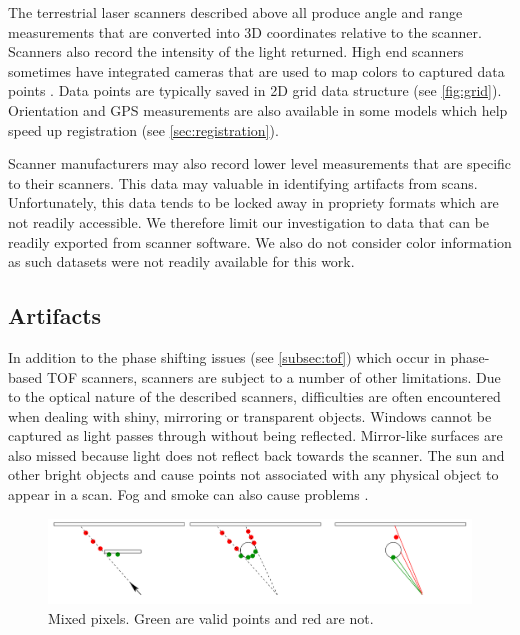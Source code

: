 The terrestrial laser scanners described above all produce angle and range measurements that are converted into 3D coordinates relative to the scanner. Scanners also record the intensity of the light returned. High end scanners sometimes have integrated cameras that are used to map colors to captured data points \cite{Frohlich2004}. Data points are typically saved in 2D grid data structure (see \autoref{fig:grid}). Orientation and GPS measurements are also available in some models which help speed up registration (see \ref{sec:registration}).

Scanner manufacturers may also record lower level measurements that are specific to their scanners. This data may valuable in identifying artifacts from scans. Unfortunately, this data tends to be locked away in propriety formats which are not readily accessible. We therefore limit our investigation to data that can be readily exported from scanner software. We also do not consider color information as such datasets were not readily available for this work.


\subsection{Artifacts} \label{sec:artifacts}

In addition to the phase shifting issues (see \ref{subsec:tof}) which occur in phase-based TOF scanners, scanners are subject to a number of other limitations. Due to the optical nature of the described scanners, difficulties are often encountered when dealing with shiny, mirroring or transparent objects. Windows cannot be captured as light passes through without being reflected. Mirror-like surfaces are also missed because light does not reflect back towards the scanner. The sun and other bright objects and cause points not associated with any physical object to appear in a scan. Fog and smoke can also cause problems \cite{Ruther2011}.


\begin{figure}[ht]
  \centering
  \includegraphics[width=1\linewidth]{images/mixed-pixel}
  \caption{Mixed pixels. Green are valid points and red are not. \cite{Tuley2005}}
  \label{fig:mixed-pixel}
\end{figure}

